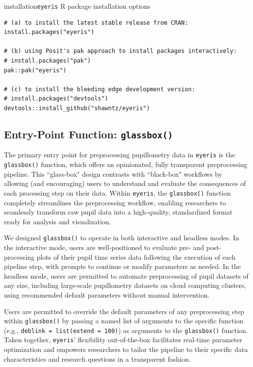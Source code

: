 \begin{eyerisbox}{installation}{\texttt{eyeris} R package installation options}
\begin{lstlisting}
# (a) to install the latest stable release from CRAN:
install.packages("eyeris")

# (b) using Posit's pak approach to install packages interactively:
# install.packages("pak")
pak::pak("eyeris")

# (c) to install the bleeding edge development version:
# install.packages("devtools")
devtools::install_github("shawntz/eyeris")
\end{lstlisting}
\end{eyerisbox}

\subsection{Entry-Point Function: \texttt{glassbox()}}
The primary entry point for preprocessing pupillometry data in \texttt{eyeris} is the \texttt{glassbox()} function, which offers an opinionated, fully transparent preprocessing pipeline. This ``glass-box" design contrasts with ``black-box" workflows by allowing (and encouraging) users to understand and evaluate the consequences of each processing step on their data. Within \texttt{eyeris}, the \texttt{glassbox()} function completely streamlines the preprocessing workflow, enabling researchers to seamlessly transform raw pupil data into a high-quality, standardized format ready for analysis and visualization.

We designed \texttt{glassbox()} to operate in both interactive and headless modes. In the interactive mode, users are well-positioned to evaluate pre- and post-processing plots of their pupil time series data following the execution of each pipeline step, with prompts to continue or modify parameters as needed. In the headless mode, users are permitted to automate preprocessing of pupil datasets of any size, including large-scale pupillometry datasets on cloud computing clusters, using recommended default parameters without manual intervention.

Users are permitted to override the default parameters of any preprocessing step within \texttt{glassbox()} by passing a named list of arguments to the specific function (e.g., \texttt{deblink = list(extend = 100)}) as arguments to the \texttt{glassbox()} function. Taken together, \texttt{eyeris}’ flexibility out-of-the-box facilitates real-time parameter optimization and empowers researchers to tailor the pipeline to their specific data characteristics and research questions in a transparent fashion.

